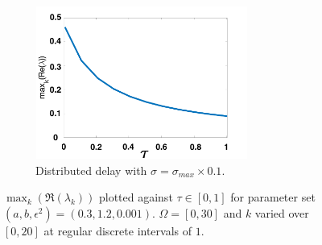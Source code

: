 \begin{figure}[H]
\begin{subfigure}[b]{0.45\textwidth}
        \centering
        \includegraphics[width=7cm,height=5cm]{p1sigmax10.png}
        \caption{Distributed delay with $\sigma=\sigma_{max}\times0.1$.}
        \label{}
    \end{subfigure}
    \caption{$\max_k(\Re(\lambda_k))$ plotted against $\tau\in[0,1]$ for parameter set $(a,b,\epsilon^2)=(0.3,1.2,0.001)$. $\Omega=[0,30]$ and $k$ varied over $[0,20]$ at regular discrete intervals of $1$.}
    \label{fig:p1}
\end{figure}
